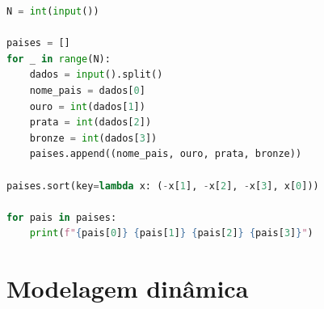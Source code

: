 \begin{lstlisting}[language=Python, caption={Código de implementação do algoritmo de implementação do problema 2}, label={lst:codigo-problema2}]
N = int(input())

paises = []
for _ in range(N):
    dados = input().split()
    nome_pais = dados[0]
    ouro = int(dados[1])
    prata = int(dados[2])
    bronze = int(dados[3])
    paises.append((nome_pais, ouro, prata, bronze))

paises.sort(key=lambda x: (-x[1], -x[2], -x[3], x[0]))

for pais in paises:
    print(f"{pais[0]} {pais[1]} {pais[2]} {pais[3]}")
\end{lstlisting}

\section{Modelagem dinâmica}
\label{sec:modelagemdinamica}
